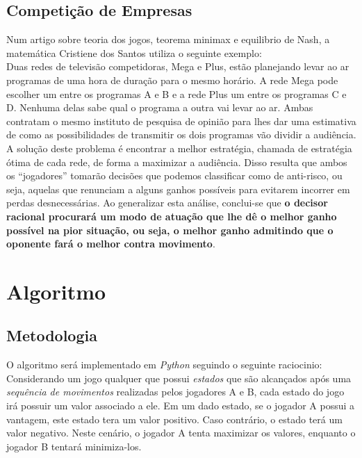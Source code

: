 \documentclass[]{article}
\begin{document}
    \subsection{Competição de Empresas}
    Num artigo sobre teoria dos jogos, teorema minimax e equilibrio de Nash, a matemática Cristiene dos Santos utiliza o seguinte exemplo: \cite{artg} \\
    
    Duas redes de televisão competidoras, Mega e Plus, estão planejando levar ao ar programas
    de uma hora de duração para o mesmo horário. A rede Mega pode escolher um entre os
    programas A e B e a rede Plus um entre os programas C e D. Nenhuma delas sabe qual o
    programa a outra vai levar ao ar. Ambas contratam o mesmo instituto de pesquisa de opinião para lhes dar uma estimativa de como as possibilidades de transmitir os dois programas vão  dividir a audiência. \\
    
    A solução deste problema é encontrar a melhor estratégia, chamada de estratégia ótima de
    cada rede, de forma a maximizar a audiência. Disso resulta que ambos os “jogadores”
    tomarão decisões que podemos classificar como de anti-risco, ou seja, aquelas que renunciam
    a alguns ganhos possíveis para evitarem incorrer em perdas desnecessárias. Ao generalizar
    esta análise, conclui-se que \textbf{o decisor racional procurará um modo de atuação que lhe dê o
    melhor ganho possível na pior situação, ou seja, o melhor ganho admitindo que o oponente
    fará o melhor contra movimento}. \\
	
\section{Algoritmo}

\subsection{Metodologia}
	O algoritmo será implementado em \emph{Python} seguindo o seguinte raciocinio: \cite{gfg}\\
	
	Considerando um jogo qualquer que possui \emph{estados} que são alcançados após uma \emph{sequência de movimentos} realizadas pelos jogadores A e B, cada estado do jogo irá possuir um valor associado a ele. Em um dado estado, se o jogador A possui a vantagem, este estado tera um valor positivo. Caso contrário, o estado terá um valor negativo. Neste cenário, o jogador A tenta maximizar os valores, enquanto o jogador B tentará minimiza-los. \\
	
\end{document}
